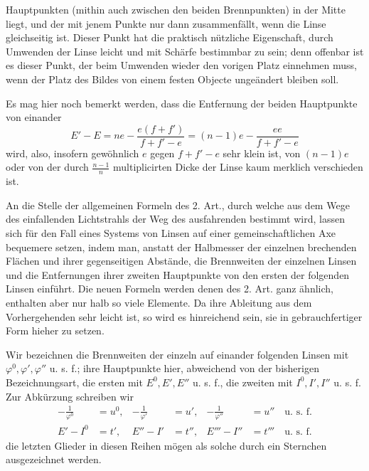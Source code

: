 Hauptpunkten (mithin auch zwischen den beiden Brennpunkten) in der Mitte liegt, und der mit jenem Punkte nur dann zusammenfällt, wenn die Linse gleichseitig ist. Dieser Punkt hat die praktisch nützliche Eigenschaft, durch Umwenden der Linse leicht und mit Schärfe bestimmbar zu sein; denn offenbar ist es dieser Punkt, der beim Umwenden wieder den vorigen Platz einnehmen muss, wenn der Platz des Bildes von einem festen Objecte ungeändert bleiben soll.

Es mag hier noch bemerkt werden, dass die Entfernung der beiden Hauptpunkte von einander
\[
E'-E=ne-\frac{e(f+f')}{f+f'-e}=(n-1)e-\frac{ee}{f+f'-e}
\]
wird, also, insofern gewöhnlich $e$ gegen $f+f'-e$ sehr klein ist, von $(n-1)e$ oder von der durch $\frac{n-1}{n}$ multiplicirten Dicke der Linse kaum merklich verschieden ist.

An die Stelle der allgemeinen Formeln des 2. Art., durch welche aus dem Wege des einfallenden Lichtstrahls der Weg des ausfahrenden bestimmt wird, lassen sich für den Fall eines Systems von Linsen auf einer gemeinschaftlichen Axe bequemere setzen, indem man, anstatt der Halbmesser der einzelnen brechenden Flächen und ihrer gegenseitigen Abstände, die Brennweiten der einzelnen Linsen und die Entfernungen ihrer zweiten Hauptpunkte von den ersten der folgenden Linsen einführt. Die neuen Formeln werden denen des 2. Art. ganz ähnlich, enthalten aber nur halb so viele Elemente. Da ihre Ableitung aus dem Vorhergehenden sehr leicht ist, so wird es hinreichend sein, sie in gebrauchfertiger Form hieher zu setzen.

Wir bezeichnen die Brennweiten der einzeln auf einander folgenden Linsen mit $\varphi^0,\varphi',\varphi''$ u. s. f.; ihre Hauptpunkte hier, abweichend von der bisherigen Bezeichnungsart, die ersten mit $E^0,E',E''$ u. s. f., die zweiten mit $I^0,I',I''$ u. s. f. Zur Abkürzung schreiben wir
\[
\begin{aligned}
-\frac1{\varphi^0}&=u^0,&-\frac1{\varphi'}&=u',&-\frac1{\varphi''}&=u''\quad\text{u. s. f.}\\
E'-I^0&=t',&E''-I'&=t'',&E'''-I''&=t'''\quad\text{u. s. f.}
\end{aligned}
\]
die letzten Glieder in diesen Reihen mögen als solche durch ein Sternchen ausgezeichnet werden.

